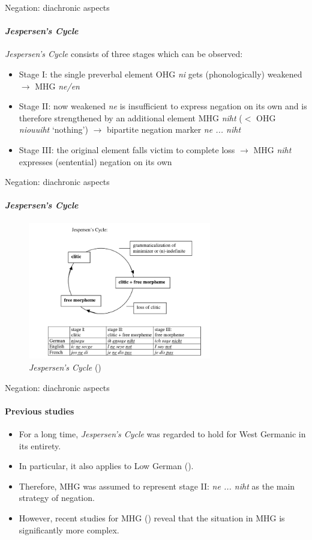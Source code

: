 \documentclass[xcolor=table, compress, %
handout
]{beamer}
\begin{document}
\begin{frame}{Negation: diachronic aspects}
\framesubtitle{\textit{Jespersen's Cycle}}
\textit{Jespersen's Cycle} consists of three stages which can be observed:

\begin{itemize}
    \item \alert{Stage I:} the single preverbal element OHG \textit{ni} gets (phonologically) weakened $\rightarrow$ MHG \textit{ne/en}
    \item \alert{Stage II:} now weakened \textit{ne} is insufficient to express negation on its own and is therefore strengthened by an additional element MHG \textit{niht} ($<$ OHG \textit{niouuiht} ‘nothing’) $\rightarrow$ \alert{bipartite negation marker} \textit{ne ... niht}
    \item \alert{Stage III:} the original element falls victim to complete loss $\rightarrow$ MHG \textit{niht} expresses (sentential) negation on its own
\end{itemize}

\end{frame}

\begin{frame}{Negation: diachronic aspects}
\framesubtitle{\textit{Jespersen's Cycle}}

\begin{figure}[h]
\centering
\includegraphics[width=8cm]{Jespersen.png}
\caption{\textit{Jespersen's Cycle} (\citealt[15]{jaeger08})}
\end{figure}


\end{frame}

\begin{frame}{Negation: diachronic aspects}
\framesubtitle{Previous studies}

\begin{itemize}
    \item For a long time, \textit{Jespersen's Cycle} was regarded to hold for West Germanic in its entirety.
    \item In particular, it also applies to Low German (\citealt{Breitbarth2014}).
    \item Therefore, MHG was assumed to represent stage II: \textit{ne ... niht} as the main strategy of negation.
    \item However, recent studies for MHG (\citealt{jaeger08,Pickl2017}) reveal that the situation in MHG is significantly more complex.
\end{itemize}

\end{frame}
\end{document}
